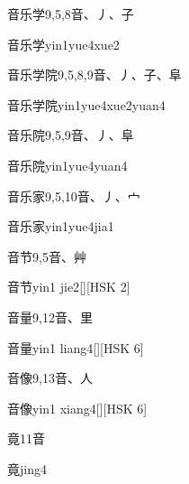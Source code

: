 \begin{Entry}{音乐学}{9,5,8}{⾳、⼃、⼦}
  \begin{Phonetics}{音乐学}{yin1yue4xue2}
  \end{Phonetics}
\end{Entry}

\begin{Entry}{音乐学院}{9,5,8,9}{⾳、⼃、⼦、⾩}
  \begin{Phonetics}{音乐学院}{yin1yue4xue2yuan4}
  \end{Phonetics}
\end{Entry}

\begin{Entry}{音乐院}{9,5,9}{⾳、⼃、⾩}
  \begin{Phonetics}{音乐院}{yin1yue4yuan4}
  \end{Phonetics}
\end{Entry}

\begin{Entry}{音乐家}{9,5,10}{⾳、⼃、⼧}
  \begin{Phonetics}{音乐家}{yin1yue4jia1}
  \end{Phonetics}
\end{Entry}

\begin{Entry}{音节}{9,5}{⾳、⾋}
  \begin{Phonetics}{音节}{yin1 jie2}[][HSK 2]
  \end{Phonetics}
\end{Entry}

\begin{Entry}{音量}{9,12}{⾳、⾥}
  \begin{Phonetics}{音量}{yin1 liang4}[][HSK 6]
  \end{Phonetics}
\end{Entry}

\begin{Entry}{音像}{9,13}{⾳、⼈}
  \begin{Phonetics}{音像}{yin1 xiang4}[][HSK 6]
  \end{Phonetics}
\end{Entry}

\begin{Entry}{竟}{11}{⾳}
  \begin{Phonetics}{竟}{jing4}
  \end{Phonetics}
\end{Entry}

